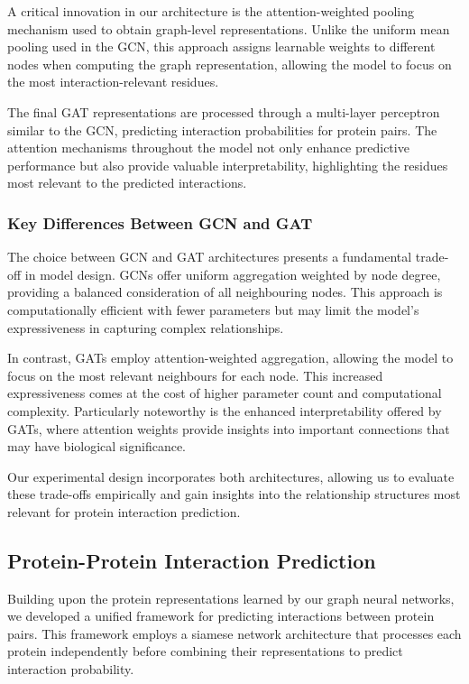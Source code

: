\documentclass[12pt,a4paper]{article}
\begin{document}
A critical innovation in our architecture is the attention-weighted pooling mechanism used to obtain graph-level representations. Unlike the uniform mean pooling used in the GCN, this approach assigns learnable weights to different nodes when computing the graph representation, allowing the model to focus on the most interaction-relevant residues.

The final GAT representations are processed through a multi-layer perceptron similar to the GCN, predicting interaction probabilities for protein pairs. The attention mechanisms throughout the model not only enhance predictive performance but also provide valuable interpretability, highlighting the residues most relevant to the predicted interactions.

\subsubsection{Key Differences Between GCN and GAT}

The choice between GCN and GAT architectures presents a fundamental trade-off in model design. GCNs offer uniform aggregation weighted by node degree, providing a balanced consideration of all neighbouring nodes. This approach is computationally efficient with fewer parameters but may limit the model's expressiveness in capturing complex relationships.

In contrast, GATs employ attention-weighted aggregation, allowing the model to focus on the most relevant neighbours for each node. This increased expressiveness comes at the cost of higher parameter count and computational complexity. Particularly noteworthy is the enhanced interpretability offered by GATs, where attention weights provide insights into important connections that may have biological significance.

Our experimental design incorporates both architectures, allowing us to evaluate these trade-offs empirically and gain insights into the relationship structures most relevant for protein interaction prediction.

\subsection{Protein-Protein Interaction Prediction}
\label{sec:ppi_prediction}

Building upon the protein representations learned by our graph neural networks, we developed a unified framework for predicting interactions between protein pairs. This framework employs a siamese network architecture that processes each protein independently before combining their representations to predict interaction probability.
\end{document}
